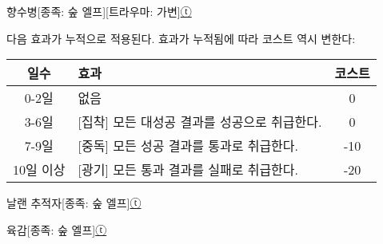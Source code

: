 \documentclass{report}
\begin{document}
	\begin{story}{향수병}{[종족: 숲 엘프][트라우마: 가변]\hyperlink{celesteela}{ⓣ}}
		
		{다음 효과가 누적으로 적용된다. 효과가 누적됨에 따라 코스트 역시 변한다:
		\begin{tightcenter}
			\begin{tabular}{c|l|c}
				\textbf{일수}      & \textbf{효과}                                & \textbf{코스트}\\\hline\hline
				0-2일              & 없음                                         & 0              \\\hline
				3-6일              & [집착] 모든 대성공 결과를 성공으로 취급한다. & 0              \\\hline
				7-9일              & [중독] 모든 성공 결과를 통과로 취급한다.     & -10            \\\hline
				10일 이상          & [광기] 모든 통과 결과를 실패로 취급한다.     & -20            \\
			\end{tabular}
		\end{tightcenter}}
		
	\end{story}
	
	\begin{story}{날랜 추적자}{[종족: 숲 엘프]\hyperlink{celesteela}{ⓣ}}
		
		
	\end{story}
	
	\begin{story}{육감}{[종족: 숲 엘프]\hyperlink{celesteela}{ⓣ}}
		
	\end{story}
\end{document}
